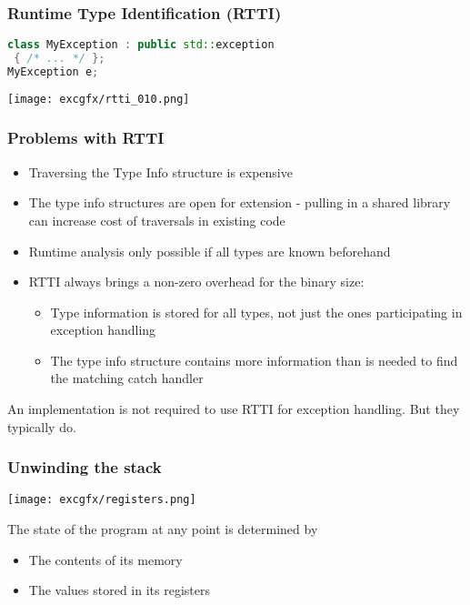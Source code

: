 \documentclass[aspectratio=169]{beamer}
\newif\iftransitions
\newcommand{\cpause}{\iftransitions \pause \fi}
\begin{document}
\begin{frame}[fragile]
  \frametitle{Runtime Type Identification (RTTI)}

  \begin{lstlisting}[language={C++}]
class MyException : public std::exception
 { /* ... */ };
MyException e;
  \end{lstlisting}

  \texttt{[image: excgfx/rtti\_010.png]}
\end{frame}


\begin{frame}

  \frametitle{Problems with RTTI}

  \begin{itemize}
  \cpause \item Traversing the Type Info structure is expensive
  \cpause \item The type info structures are open for extension - pulling in a shared library can increase cost of traversals in existing code
  \cpause \item Runtime analysis only possible if all types are known beforehand
  \cpause \item RTTI always brings a non-zero overhead for the binary size:
    \begin{itemize}
    \cpause \item Type information is stored for all types, not just the ones participating in exception handling
    \cpause \item The type info structure contains more information than is needed to find the matching catch handler
    \end{itemize}
  \end{itemize}

  \cpause An implementation is not required to use RTTI for exception handling. But they typically do.
\end{frame}


\begin{frame}
  \frametitle{Unwinding the stack}

  \texttt{[image: excgfx/registers.png]}

  \vspace{24pt}

  The state of the program at any point is determined by
  \begin{itemize}
  \item The contents of its memory
  \item The values stored in its registers
  \end{itemize}
\end{frame}
\end{document}
